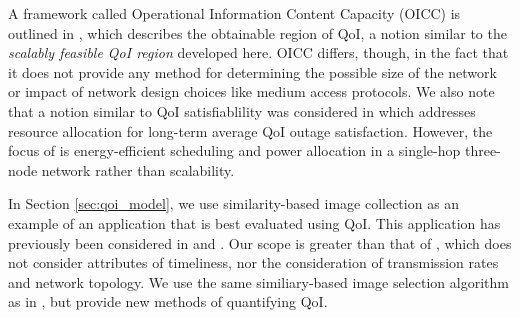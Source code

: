 
A framework called Operational Information Content Capacity (OICC) is outlined in \cite{oicc_journal}, which describes the obtainable region of QoI, a notion similar to the \emph{scalably feasible QoI region} developed here. OICC differs, though, in the fact that it does not provide any method for determining the possible size of the network or impact of network design choices like medium access protocols. We also note that a notion similar to QoI satisfiablility was considered in \cite{qoi_outage} which addresses resource allocation for long-term average QoI outage satisfaction. However, the focus of \cite{qoi_outage} is energy-efficient scheduling and power allocation in a single-hop three-node network rather than scalability. 

In Section \ref{sec:qoi_model}, we use similarity-based image collection as an example of an application that is best evaluated using QoI.  This application has previously been considered in \cite{photonet} and \cite{mediascope}. Our scope is greater than that of \cite{photonet}, which does not consider attributes of timeliness, nor the consideration of transmission rates and network topology.  We use the same similiary-based image selection algorithm as in \cite{mediascope}, but provide new methods of quantifying QoI.%

